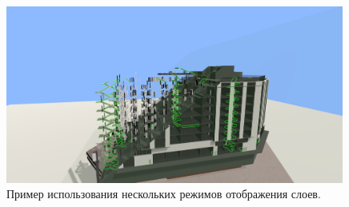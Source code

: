 \begin{figure}[!htp]
    \centering
    \includegraphics[width=0.99\textwidth, frame]{images/LayerModeExample.png}
    \caption{Пример использования нескольких режимов отображения слоев.}
    \label{figure:LayerModeExample}
\end{figure}
